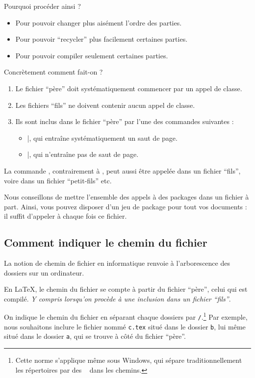 Pourquoi procéder ainsi ?
\begin{itemize}
\item Pour pouvoir changer plus aisément l'ordre des parties. 
\item Pour pouvoir \enquote{recycler} plus facilement certaines parties.
\item Pour pouvoir compiler seulement certaines parties.
\end{itemize}

Concrètement comment fait-on ?
\begin{enumerate}
\item Le fichier \enquote{père} doit systématiquement commencer par un appel de classe.
\item Les fichiers \enquote{fils} ne doivent contenir aucun appel de classe.
\item Ils sont inclus dans le fichier \enquote{père} par l'une des commandes suivantes :
\begin{itemize}
	\item {}|, qui entraîne systématiquement un saut de page.
	\item {}|, qui n'entraîne pas de saut de page.\label{input}
\end{itemize}
\end{enumerate}

La commande , contrairement à , peut aussi être  appelée dans un fichier \enquote{fils}, voire dans un fichier \enquote{petit-fils} etc.

Nous conseillons de mettre l'ensemble des appels à des packages dans un fichier à part. Ainsi, vous pouvez disposer d'un jeu de package pour tout vos documents : il suffit d'appeler à chaque fois ce fichier.


\subsection{Comment indiquer le chemin du fichier}\label{chemin}

La notion de chemin de fichier en informatique renvoie à l'arborescence des dossiers sur un ordinateur.

En \LaTeX{}, le chemin du fichier se compte à partir du fichier \enquote{père}, celui qui est compilé. \emph{Y compris lorsqu'on procède à une inclusion dans un fichier \enquote{fils}}.

On indique le chemin du fichier en séparant chaque dossiers par \verb|/|.\footnote{Cette norme s'applique même sous Windows, qui sépare traditionnellement les répertoires par des \texttt{\ } dans les chemins.} Par exemple, nous souhaitons inclure le fichier nommé \verb|c.tex| situé dans le dossier \verb|b|, lui même situé dans le dossier \verb|a|, qui se trouve à côté du fichier \enquote{père}.

